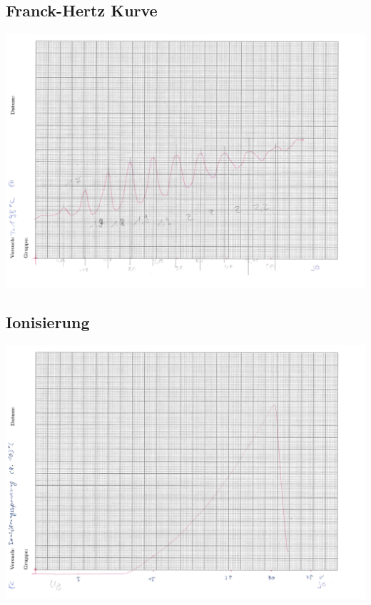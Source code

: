 \subsection{Franck-Hertz Kurve}
\begin{landscape}
\includegraphics[page = 1, scale = 0.8]{8b.pdf}
\label{fig:8b}
\end{landscape}
\subsection{Ionisierung}
\begin{landscape}
\includegraphics[page = 1, scale = 0.8]{8c.pdf}
\label{fig:8c}
\end{landscape}
